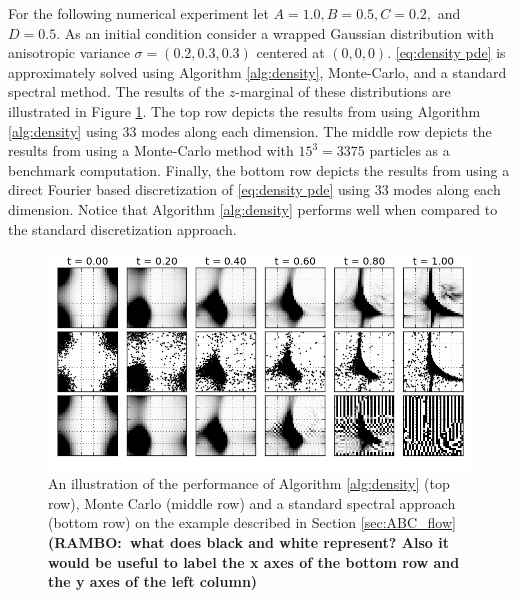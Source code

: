 \documentclass[final,leqno]{siamltex1213}
\newcommand{\ram}[1]{{\normalsize{\textbf{({\color{red}RAMBO:\ }#1)}}}}
\begin{document}
%
For the following numerical experiment let $A=1.0,B=0.5,C=0.2,$ and $D=0.5$.
As an initial condition consider a wrapped Gaussian distribution with anisotropic variance $\sigma= (0.2, 0.3, 0.3)$ centered at $(0,0,0)$.
\eqref{eq:density pde} is approximately solved using Algorithm \ref{alg:density}, Monte-Carlo, and a standard spectral method.
The results of the $z$-marginal of these distributions are illustrated in Figure \ref{fig:ABCD}.
The top row depicts the results from using Algorithm \ref{alg:density} using $33$ modes along each dimension.
The middle row depicts the results from using a Monte-Carlo method with $15^{3} = 3375$ particles as a benchmark computation.
Finally, the bottom row depicts the results from using a direct Fourier based discretization of \eqref{eq:density pde} using 33 modes along each dimension.
Notice that Algorithm \ref{alg:density} performs well when compared to the standard discretization approach.

\begin{figure}
	\centering
	\includegraphics[width=1\textwidth]{./images/ABCD_flow.png}
	\caption{An illustration of the performance of Algorithm \ref{alg:density} (top row), Monte Carlo (middle row) and a standard spectral approach (bottom row) on the example described in Section \ref{sec:ABC_flow} \ram{what does black and white represent? Also it would be useful to label the x axes of the bottom row and the y axes of the left column}}
	\label{fig:ABCD}
\end{figure}
\end{document}
